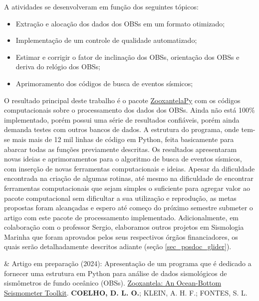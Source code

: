 \documentclass[10pt,a4paper,oneside]{book}
\begin{document}
A atividades se desenvolveram em função dos seguintes tópicos:
\begin{itemize}
	\item Extração e alocação dos dados dos OBSs em um formato otimizado;
	\item Implementação de um controle de qualidade automatizado;
	\item Estimar e corrigir o fator de inclinação dos OBSs, orientação dos OBSs e deriva do relógio dos OBSs;
	\item Aprimoramento dos códigos de busca de eventos sísmicos;
\end{itemize}

O resultado principal deste trabalho é o pacote \href{https://github.com/dIOGOLOC/ZooxantelaPy}{ZooxantelaPy} com os códigos computacionais sobre o processamento dos dados dos OBSs. Ainda não está 100\% implementado, porém possui uma série de resultados confiáveis, porém ainda demanda testes com outros bancos de dados. A estrutura do programa, onde tem-se mais mais de 12 mil linhas de código em Python, feita basicamente para abarcar todas as funções previamente descritas. Os resultados apresentaram novas ideias e aprimoramentos para o algoritmo de busca de eventos sísmicos, com inserção de novas ferramentas computacionais e ideias. Apesar da dificuldade encontrada na criação de algumas rotinas, até mesmo na dificuldade de encontrar ferramentas computacionais que sejam simples o suficiente para agregar valor ao pacote computacional sem dificultar a sua utilização e reprodução, as metas propostas foram alcançadas e espero até começo do próximo semestre submeter o artigo com este pacote de processamento implementado. Adicionalmente, em colaboração com o professor Sergio, elaboramos outros projetos em Sismologia Marinha que foram aprovados pelos seus respectivos órgãos financiadores, os quais serão detalhadamente descritos adiante (seção \ref{sec_posdoc_glider}).

\bigskip

\begin{summarybox}[frametitle=\faBookmark{}\quad Resumo de atividades científicas]
	\begin{fa-ul}
\faBook & Artigo em preparação (2024): Apresentação de um programa que é dedicado a fornecer uma estrutura em Python para análise de dados sismológicos de sismômetros de fundo oceânico (OBSs). \href{https://zooxantelapy.readthedocs.io/}{Zooxantela: An Ocean-Bottom Seismometer Toolkit}. \textbf{COELHO, D. L. O.}; KLEIN, A. H. F.; FONTES, S. L.
	\end{fa-ul}
\end{summarybox}
\end{document}
